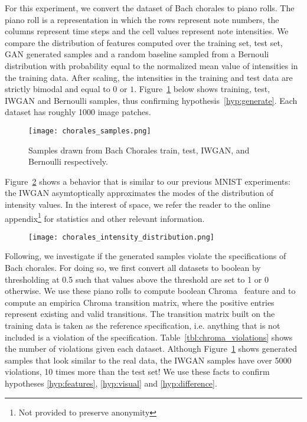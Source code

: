 For this experiment, we convert the dataset of Bach chorales to piano rolls. The
piano roll is a representation in which the rows represent note numbers, the columns
represent time steps and the cell values represent note intensities. We compare
the distribution of features computed over the training set, test set, GAN
generated samples and a random baseline sampled from a Bernouli distribution with 
probability equal to the normalized mean value of intensities in the
training data. After scaling, the intensities in the training and test data are
strictly bimodal and equal to $0$ or $1$. Figure~\ref{fig:chorales_samples} below
shows training, test, IWGAN and Bernoulli samples, thus confirming
hypothesis~\ref{hyp:generate}. Each dataset has roughly 1000 image patches.

\begin{figure}[!h]
  \begin{center}
  \texttt{[image: chorales\_samples.png]}
  \caption{Samples drawn from Bach Chorales train, test,
IWGAN, and Bernoulli respectively.}
  \label{fig:chorales_samples}
  \end{center}
\end{figure}

Figure~\ref{fig:chorales_intensity_distribution} shows a behavior that is
similar to our previous MNIST experiments: the IWGAN asymtoptically approximates
the modes of the distribution of intensity values. In the 
interest of space, we refer the reader to the online appendix\footnote{Not
provided to preserve anonymity} for statistics and other relevant information. 

\begin{figure}[!h]
  \texttt{[image: chorales\_intensity\_distribution.png]}
  \caption{}
  \label{fig:chorales_intensity_distribution}
\end{figure}

Following, we investigate if the generated samples violate the specifications of
Bach chorales. For doing so, we first convert all datasets to boolean by 
thresholding at 0.5 such that values above the threshold are set to 1 or 0
otherwise. We use
these piano rolls to compute boolean Chroma~\cite{peeters2004large} feature and
to compute an empirica Chroma transition matrix, where the positive
entries represent existing and valid transitions. The transition matrix built on 
the training data is taken as the reference specification, i.e. anything that is 
not included is a violation of the specification. Table~\ref{tbl:chroma_violations}
shows the number of violations given each dataset. Although
Figure~\ref{fig:chorales_samples} shows generated samples that look similar to
the real data, the IWGAN samples have over 5000
violations, 10 times more than the test set! We use these facts to confirm
hypotheses \ref{hyp:features}, \ref{hyp:visual} and \ref{hyp:difference}.

